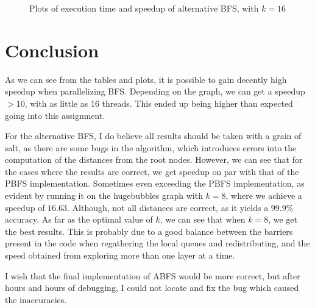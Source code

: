 \documentclass{article}
\begin{document}
\begin{figure}[H]
\begin{minipage}{0.45\textwidth}
        \end{minipage}
        \caption{Plots of execution time and speedup of alternative BFS, with \( k = 16 \)}
    \end{figure}

    \section{Conclusion}
    As we can see from the tables and plots, it is possible to gain decently high speedup when parallelizing BFS. Depending on the graph, we can get a speedup \( >10 \), with as little as 16 threads. This ended up being higher than expected going into this assignment.
    \medskip

    For the alternative BFS, I do believe all results should be taken with a grain of salt, as there are some bugs in the algorithm, which introduces errors into the computation of the distances from the root nodes. However, we can see that for the cases where the results are correct, we get speedup on par with that of the PBFS implementation. Sometimes even exceeding the PBFS implementation, as evident by running it on the hugebubbles graph with \( k = 8 \), where we achieve a speedup of \( 16.63 \). Although, not all distances are correct, as it yields a \( 99.9\% \) accuracy. As far as the optimal value of \( k \), we can see that when \( k  = 8\), we get the best results. This is probably due to a good balance between the barriers present in the code when regathering the local queues and redistributing, and the speed obtained from exploring more than one layer at a time.
    \medskip

    I wish that the final implementation of ABFS would be more correct, but after hours and hours of debugging, I could not locate and fix the bug which caused the inaccuracies.
\end{document}
